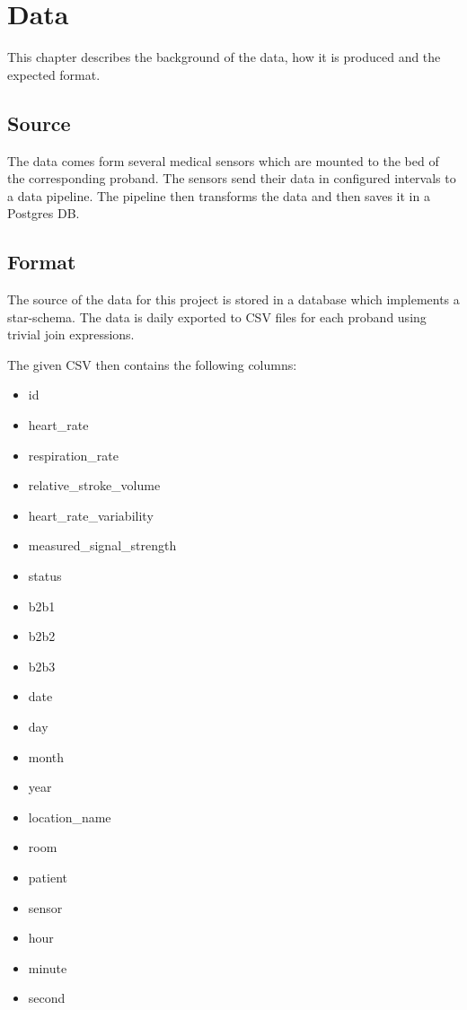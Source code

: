 \chapter{Data}

This chapter describes the background of the data, how it is produced and the expected format.

\section{Source}
The data comes form several medical sensors which are mounted to the bed of the corresponding proband. The sensors send their data in configured intervals to a data pipeline. The pipeline then transforms the data and then saves it in a Postgres DB.

\section{Format}
\label{c:data_format}

The source of the data for this project is stored in a database which implements a star-schema. The data is daily exported to CSV files for each proband using trivial join expressions.

The given CSV then contains the following columns:

\begin{itemize}
  \item id
  \item heart\_rate
  \item respiration\_rate
  \item relative\_stroke\_volume
  \item heart\_rate\_variability
  \item measured\_signal\_strength
  \item status
  \item b2b1
  \item b2b2
  \item b2b3
  \item date
  \item day
  \item month
  \item year
  \item location\_name
  \item room
  \item patient
  \item sensor
  \item hour
  \item minute
  \item second
\end{itemize}

